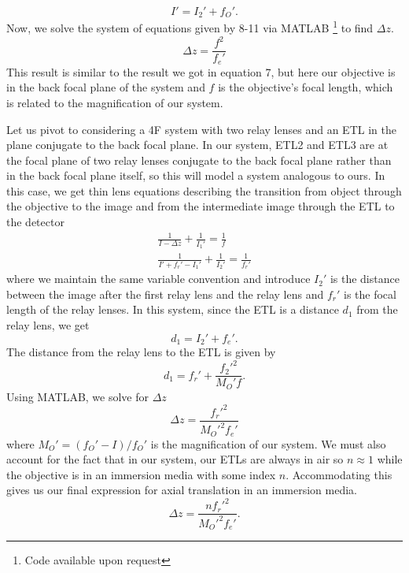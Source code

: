 \begin{equation}
	I' = I_2' + f_O'.
\end{equation}
Now, we solve the system of equations given by 8-11 via MATLAB \footnote{Code available upon request} to find $\Delta z$.
\begin{equation}
	\Delta z = \frac{f^2}{f_e'}
\end{equation}
This result is similar to the result we got in equation 7, but here our objective is in the back focal plane of the system and $f$ is the objective's focal length, which is related to the magnification of our system. 
\par Let us pivot to considering a 4F system with two relay lenses and an ETL in the plane conjugate to the back focal plane. In our system, ETL2 and ETL3 are at the focal plane of two relay lenses conjugate to the back focal plane rather than in the back focal plane itself, so this will model a system analogous to ours. In this case, we get thin lens equations describing the transition from object through the objective to the image and from the intermediate image through the ETL to the detector
\begin{gather}
	\frac{1}{I-\Delta z}+\frac 1{I_1'} = \frac 1{f}\\
	\frac{1}{I' + f_r' - I_1'}+\frac1{I_2'} = \frac{1}{f_r'}
\end{gather}
where we maintain the same variable convention and introduce $I_2'$ is the distance between the image after the first relay lens and the relay lens and $f_r'$ is the focal length of the relay lenses. In this system, since the ETL is a distance $d_1$ from the relay lens, we get 
 \begin{equation}
	d_1 = I_2' + f_e'.
\end{equation}
The distance from the relay lens to the ETL is given by
\begin{equation}
	d_1 = f_r' + \frac{f_2'^2}{M_O' f}.
\end{equation}
Using MATLAB, we solve for $\Delta z$
\begin{equation}
	\Delta z = %
	\frac{f_r'^2}{M_O'^2 f_e'}
\end{equation}
where $M_O' = (f_O'-I)/f_O'$ is the magnification of our system. We must also account for the fact that in our system, our ETLs are always in air so $n\approx 1$ while the objective is in an immersion media with some index $n$. Accommodating this \cite{Fahrbach} gives us our final expression for axial translation in an immersion media.
\begin{equation}
	\Delta z = \frac{nf_r'^2}{M_O'^2 f_e'}.
\end{equation}
